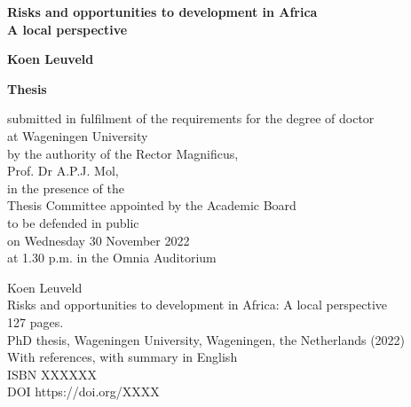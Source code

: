 \begin{titlepage}
   \begin{center}
       \vspace*{1cm}

       \Huge
       \textbf{Risks and opportunities to development in Africa \\ \LARGE A local perspective}

       \vspace*{60pt}

       \large  
       \textbf{Koen Leuveld}

      \vfill

      \normalsize
      \textbf{Thesis}

      submitted in fulfilment of the requirements for the degree of doctor \\
      at Wageningen University \\
      by the authority of the Rector Magnificus, \\
      Prof. Dr A.P.J. Mol, \\
      in the presence of the \\
      Thesis Committee appointed by the Academic Board \\
      to be defended in public \\
      on Wednesday 30 November 2022 \\
      at 1.30 p.m. in the Omnia Auditorium
      \vspace{0.8cm}


         
   \end{center}
\end{titlepage}


\begin{titlepage}
   \vspace*{1cm}
   \vspace*{\fill}

   \noindent
   Koen Leuveld \\
   Risks and opportunities to development in Africa: A local perspective \\
   127 pages. \\

   \noindent
   PhD thesis, Wageningen University, Wageningen, the Netherlands (2022) \\
   With references, with summary in English \\

   \noindent
   ISBN XXXXXX \\
   DOI https://doi.org/XXXX \\
   \vspace{0.8cm}
\end{titlepage}

